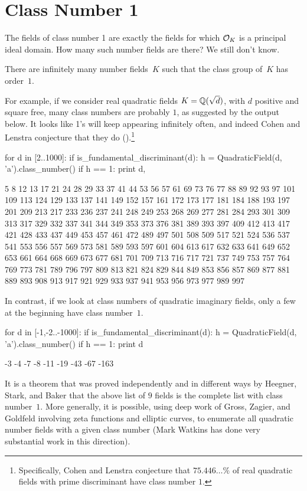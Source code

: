 \section{Class Number 1}\label{sec:cn1}

The fields of class number 1 are exactly the fields for
which $\mathcal{O}_K$ is a principal ideal domain.  How many such
number fields are there?   We still don't know.
\begin{conjecture}
	There are infinitely many number fields~$K$ such that the class
	group of~$K$ has order~$1$.
\end{conjecture}
For example, if we consider real quadratic fields $K=\mathbb{Q}(\sqrt{d})$,
with $d$ positive and square free, many class numbers are probably $1$,
as suggested by the \sage output below.
It looks like 1's will keep appearing infinitely often, and indeed
Cohen and Lenstra conjecture that they do
(\cite{cohen-lenstra:heuristics}).\footnote{Specifically, Cohen and
Lenstra conjecture that $75.446\dots\%$ of real quadratic fields
with prime discriminant have class number $1$.}
\begin{sagecode}
\begin{sagecell}
for d in [2..1000]:
    if is_fundamental_discriminant(d):
        h = QuadraticField(d, 'a').class_number()
        if h == 1:
            print d,
\end{sagecell}
\begin{sageout}
5 8 12 13 17 21 24 28 29 33 37 41 44 53 56 57 61 69
73 76 77 88 89 92 93 97 101 109 113 124 129 133 137
141 149 152 157 161 172 173 177 181 184 188 193 197
201 209 213 217 233 236 237 241 248 249 253 268 269
277 281 284 293 301 309 313 317 329 332 337 341 344
349 353 373 376 381 389 393 397 409 412 413 417 421
428 433 437 449 453 457 461 472 489 497 501 508 509
517 521 524 536 537 541 553 556 557 569 573 581 589
593 597 601 604 613 617 632 633 641 649 652 653 661
664 668 669 673 677 681 701 709 713 716 717 721 737
749 753 757 764 769 773 781 789 796 797 809 813 821
824 829 844 849 853 856 857 869 877 881 889 893 908
913 917 921 929 933 937 941 953 956 973 977 989 997
\end{sageout}
\end{sagecode}
In contrast, if we look at class numbers of quadratic imaginary fields,
only a few at the beginning have class number~$1$.
\begin{sagecode}
\begin{sagecell}
for d in [-1,-2..-1000]:
    if is_fundamental_discriminant(d):
        h = QuadraticField(d, 'a').class_number()
        if h == 1:
            print d
\end{sagecell}
\begin{sageout}
-3 -4 -7 -8 -11 -19 -43 -67 -163
\end{sageout}
\end{sagecode}
It is a theorem that was proved independently and in different ways by
Heegner, Stark, and Baker that the above list of $9$ fields is the
complete list with class number~$1$.  More generally, it is possible,
using deep work of Gross, Zagier, and Goldfeld involving zeta
functions and elliptic curves, to enumerate all quadratic number
fields with a given class number (Mark Watkins has done very
substantial work in this direction).

